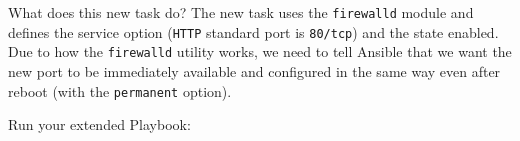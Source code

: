 \begin{Shaded}
\begin{Highlighting}[]
\PreprocessorTok{{-}{-}{-}}
\KeywordTok{{-}}\AttributeTok{ }\KeywordTok{:}
\AttributeTok{  }\KeywordTok{:}
\AttributeTok{  }\KeywordTok{:}\AttributeTok{ }
\AttributeTok{  }\KeywordTok{:}
\AttributeTok{    }\KeywordTok{{-}}\AttributeTok{ }\KeywordTok{:}
\AttributeTok{      }\KeywordTok{:}
\AttributeTok{        }\KeywordTok{:}
\AttributeTok{    }\KeywordTok{{-}}\AttributeTok{ }\KeywordTok{:}
\AttributeTok{      }\KeywordTok{:}
\AttributeTok{        }\KeywordTok{:}
\AttributeTok{        }\KeywordTok{:}\AttributeTok{ }
\AttributeTok{        }\KeywordTok{:}
\AttributeTok{    }\KeywordTok{{-}}\AttributeTok{ }\KeywordTok{:}
\AttributeTok{      }\KeywordTok{:}
\AttributeTok{        }\KeywordTok{:}
\AttributeTok{        }\KeywordTok{:}
\AttributeTok{        }\KeywordTok{:}
\AttributeTok{        }\KeywordTok{:}
\end{Highlighting}
\end{Shaded}

What does this new task do? The new task uses the \texttt{firewalld}
module and defines the service option (\texttt{HTTP} standard port is \texttt{80/tcp}) and the state enabled.
Due to how the \texttt{firewalld} utility works, we need to tell Ansible that we want the new port to be immediately available and configured in the same way even after reboot (with the \texttt{permanent} option).

Run your extended Playbook:

\begin{Shaded}
\begin{Highlighting}[]
\ExtensionTok{[student@controller}\NormalTok{ ansible{-}files]$ ansible{-}navigator run apache.yml }
\end{Highlighting}
\end{Shaded}

